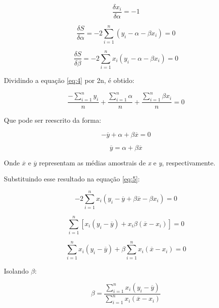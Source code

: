 \begin{equation*}
\frac{\delta x_i}{\delta \alpha} = -1
\end{equation*}

\begin{equation}\label{eq:4}
\frac{\delta S}{\delta \alpha} = -2 \sum_{i=1}^{n} (y_i - \alpha - \beta x_i) = 0
\end{equation}

\begin{equation}\label{eq:5}
\frac{\delta S}{\delta \beta} = -2 \sum_{i=1}^{n} x_i (y_i - \alpha - \beta x_i) = 0
\end{equation}

Dividindo a equação \ref{eq:4} por 2n, é obtido:

\begin{equation*}
 \frac {-\sum_{i=1}^{n}y_i}{n} + \frac{\sum_{i=1}^{n}\alpha}{n} + \frac{\sum_{i=1}^{n}\beta x_i}{n} = 0
\end{equation*}

Que pode ser reescrito da forma:

\begin{equation*}
 - \overline{y} + \alpha + \beta \overline{x} = 0 
\end{equation*}

\begin{equation}\label{eq:6}
\overline{y}  = \alpha + \beta \overline{x} 
\end{equation}

Onde $\overline{x}$ e $\overline{y}$ representam as médias amostrais de \textit{x} e \textit{y}, respectivamente.

Substituindo esse resultado na equação \ref{eq:5}:

\begin{equation*}
-2 \sum_{i=1}^{n} x_i (y_i - \overline{y} + \beta \overline{x} - \beta x_i) = 0
\end{equation*}

\begin{equation*}
\sum_{i=1}^{n}[x_i (y_i - \overline{y}) + x_i \beta (\overline{x} - x_i)] = 0
\end{equation*}

\begin{equation*}
\sum_{i=1}^{n} x_i (y_i - \overline{y}) + \beta \sum_{i=1}^{n} x_i  (\overline{x} - x_i) = 0
\end{equation*}

Isolando $\beta$:

\begin{equation}\label{eq:7}
\beta = \frac{\sum_{i=1}^{n} x_i (y_i - \overline{y})}{\sum_{i=1}^{n} x_i(\overline{x} - x_i)}
\end{equation}

